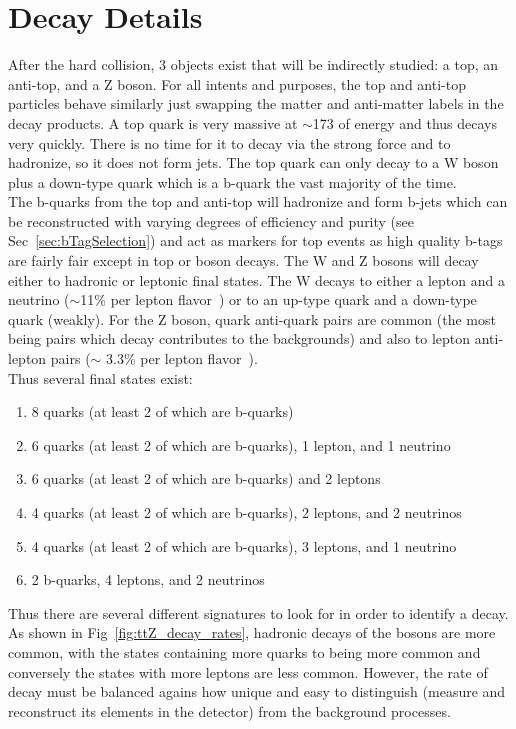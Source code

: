 	\section{\ttZ Decay Details}
	After the hard collision, 3 objects exist that will be indirectly studied: a top, an anti-top, and a Z boson. For all intents and purposes, the top and anti-top particles behave similarly just swapping the matter and anti-matter labels in the decay products. A top quark is very massive at $\sim$173 \GeV of energy and thus decays very quickly. There is no time for it to decay via the strong force and to hadronize, so it does not form jets. The top quark can only decay to a W boson plus a down-type quark which is a b-quark the vast majority of the time. \\
	
	The b-quarks from the top and anti-top will hadronize and form b-jets which can be reconstructed with varying degrees of efficiency and purity (see Sec~\ref{sec:bTagSelection}) and act as markers for top events as high quality b-tags are fairly fair except in top or boson decays. The W and Z bosons will decay either to hadronic or leptonic final states. The W decays to either a lepton and a neutrino ($\sim$11\% per lepton flavor~\cite{pdg}) or to an up-type quark and a down-type quark (weakly). For the Z boson, quark anti-quark pairs are common (the most being \bbbar pairs which decay contributes to the \ttZ backgrounds) and also to lepton anti-lepton pairs ($\sim$ 3.3\% per lepton flavor~\cite{pdg}).\\
	
	Thus several final states exist:
	\begin{enumerate}
	\item 8 quarks (at least 2 of which are b-quarks)
	\item 6 quarks (at least 2 of which are b-quarks), 1 lepton, and 1 neutrino
	\item 6 quarks (at least 2 of which are b-quarks) and 2 leptons
	\item 4 quarks (at least 2 of which are b-quarks), 2 leptons, and 2 neutrinos
	\item 4 quarks (at least 2 of which are b-quarks), 3 leptons, and 1 neutrino
	\item 2 b-quarks, 4 leptons, and 2 neutrinos
	\end{enumerate}
	
	Thus there are several different signatures to look for in order to identify a \ttZ decay. As shown in Fig~\ref{fig:ttZ_decay_rates}, hadronic decays of the bosons are more common, with the states containing more quarks to being more common and conversely the states with more leptons are less common. However, the rate of decay must be balanced agains how unique and easy to distinguish (measure and reconstruct its elements in the detector) from the background processes.
	
